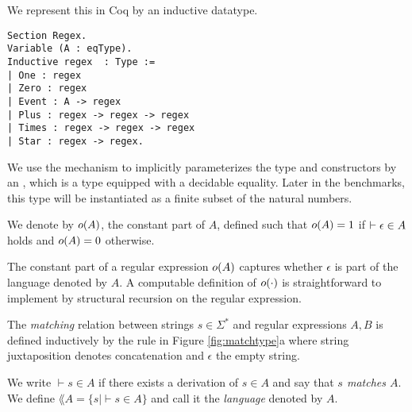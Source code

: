 We represent this in Coq by an inductive datatype.
\begin{samepage}
\begin{verbatim}
Section Regex.
Variable (A : eqType).
Inductive regex  : Type :=
| One : regex
| Zero : regex
| Event : A -> regex
| Plus : regex -> regex -> regex
| Times : regex -> regex -> regex
| Star : regex -> regex.    
\end{verbatim}
\end{samepage}
We use the  mechanism to implicitly parameterizes the type
 and constructors by an , which is a type
equipped with a decidable equality. Later in the benchmarks, this type
will be instantiated as a finite subset of the natural numbers. 
\begin{definition}
We denote by $o(A)$, the constant part of $A$, defined such that
$o(A)=1$ if $\vdash \epsilon \in A$ holds and $o(A)=0$
otherwise.
\end{definition}
The constant part of a regular expression $o(A)$ captures whether
$\epsilon$ is part of the language denoted by $A$. A computable
definition of $o(\cdot)$ is straightforward to implement by
structural recursion on the regular expression.
\begin{definition}[Matching]
The \emph{matching} relation between strings $s \in \Sigma^*$ and regular expressions $A, B$ is defined inductively by
the rule in Figure \ref{fig:matchtype}a where string juxtaposition denotes concatenation and $\epsilon$ the
empty string.

We write $\vdash s \in A$ if there exists a derivation of $s \in A$ and say that \emph{$s$ matches $A$}.
We define $\lang{A} = \{ s \mid \vdash s \in A \}$ and call it the \emph{language} denoted by $A$.
\end{definition}

